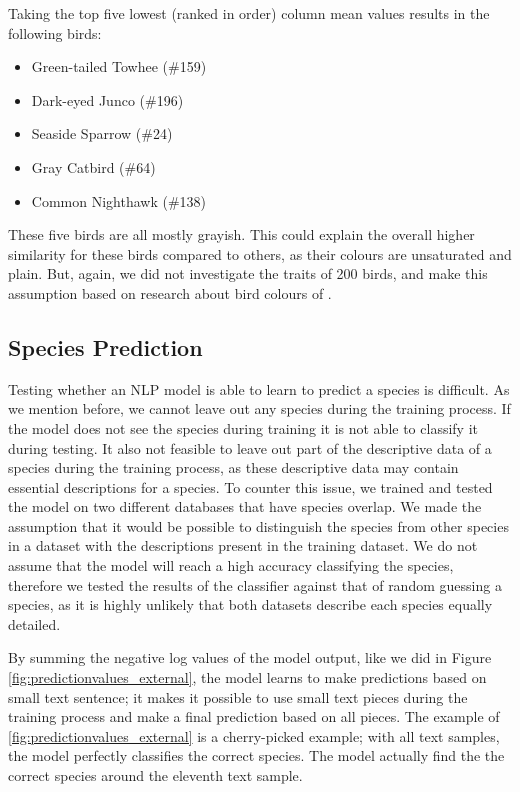 \documentclass[a4paper, 12pt, oneside]{book} %
\begin{document}
Taking the top five lowest (ranked in order) column mean values results in the following birds: 
\begin{itemize}
    \setlength\itemsep{-0.25em}
    \item Green-tailed Towhee (\#159)
    \item Dark-eyed Junco (\#196)
    \item Seaside Sparrow (\#24)
    \item Gray Catbird (\#64)
    \item Common Nighthawk (\#138)
\end{itemize}
These five birds are all mostly grayish.
This could explain the overall higher similarity for these birds compared to others, as their colours are unsaturated and plain.
But, again, we did not investigate the traits of 200 birds, and make this assumption based on research about bird colours of \textcite{delhey_colour_2016}.

\subsection{Species Prediction}
Testing whether an NLP model is able to learn to predict a species is difficult.
As we mention before, we cannot leave out any species during the training process.
If the model does not see the species during training it is not able to classify it during testing.
It also not feasible to leave out part of the descriptive data of a species during the training process, as these descriptive data may contain essential descriptions for a species.
To counter this issue, we trained and tested the model on two different databases that have species overlap.
We made the assumption that it would be possible to distinguish the species from other species in a dataset with the descriptions present in the training dataset.
We do not assume that the model will reach a high accuracy classifying the species, therefore we tested the results of the classifier against that of random guessing a species, as it is highly unlikely that both datasets describe each species equally detailed.

By summing the negative log values of the model output, like we did in Figure \ref{fig:predictionvalues_external}, the model learns to make predictions based on small text sentence; it makes it possible to use small text pieces during the training process and make a final prediction based on all pieces.
The example of \ref{fig:predictionvalues_external} is a cherry-picked example; with all text samples, the model perfectly classifies the correct species.
The model actually find the the correct species around the eleventh text sample.
\end{document}
